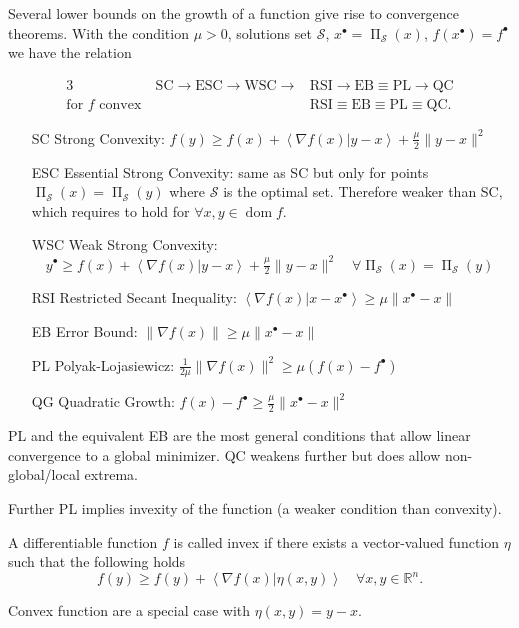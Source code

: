 \documentclass[varwidth=15cm, border=.5cm]{standalone}
\DeclareMathOperator{\proj}{\Pi}
\DeclareMathOperator{\domain}{dom}
\newcommand{\innerp}[2]{\left\langle #1 \vert #2 \right\rangle}
\newcommand{\optimal}[1]{{#1^{\scriptscriptstyle\bullet}}}
\begin{document}
\begin{remark}[label=9wm37o_t, name=Relationship between optimality bounds]
	Several lower bounds on the growth of a function give rise to
	convergence theorems. With the condition \(\mu>0\), solutions set
	\(\mathcal S\), \(\optimal{x} = \proj_{\mathcal S}(x)\), \(f(\optimal{x}) = \optimal{f}\) we 
	have the relation

	\begin{alignat}{3}
		&\text{SC}\to\text{ESC}\to\text{WSC}\to&\text{RSI}\to\text{EB}\equiv\text{PL}\to\text{QC} \\
		\text{for } f \text{ convex}~&&\text{RSI}\equiv\text{EB}\equiv\text{PL}\equiv\text{QC}.
	\end{alignat}

	\begin{enumerate}
		\item[SC] Strong Convexity: \(f(y) \geq f(x) + \innerp{\nabla f(x)}{y-x} + \frac{\mu}{2}\lVert y-x\rVert^2\)
		\item[ESC] Essential Strong Convexity: same as SC but only for
			points \(\proj_\mathcal{S}(x) = \proj_\mathcal{S}(y)\) where \(\mathcal S\) is the optimal 
			set. Therefore weaker than SC, which requires to hold 
			for \(\forall x,y\in\domain{f}\).
		\item[WSC] Weak Strong Convexity: \(\quad\optimal{y} \geq f(x) +
			\innerp{\nabla f(x)}{y-x} + \frac{\mu}{2}\lVert
			y-x\rVert^2 \quad \forall \proj_{\mathcal S}(x) = \proj_{\mathcal S}(y)\)
		\item[RSI] Restricted Secant Inequality: \(\innerp{\nabla
			f(x)}{x-\optimal{x}} \geq \mu\lVert \optimal{x} - x\rVert\)
		\item[EB] Error Bound: \(\lVert\nabla f(x)\rVert \geq \mu\lVert \optimal{x} - x\rVert\)
		\item[PL] Polyak-Lojasiewicz: \(\frac{1}{2\mu}\lVert\nabla f(x)\rVert^2\geq\mu(f(x) - \optimal{f})\)
		\item[QG] Quadratic Growth: \(f(x) - \optimal{f} \geq \frac{\mu}{2}\lVert \optimal{x} - x\lVert^2\)
	\end{enumerate}

	PL and the equivalent EB are the most general conditions that allow
	linear convergence to a global minimizer. QC weakens further but does
	allow non-global/local extrema.

	Further PL implies invexity of the function (a weaker condition than
	convexity). 
\end{remark}

\begin{definition}[label=5ijd2wuq, name=Invex Functions]
	A differentiable function \(f\) is called invex if there exists a 
	vector-valued function \(\eta\) such that the following holds
	\[
		f(y) \geq f(y) + \innerp{\nabla f(x)}{\eta(x,y)} \quad \forall x,y\in\mathbb R^n.
	\]

	Convex function are a special case with \(\eta(x,y) = y-x\).
\end{definition}
\end{document}
